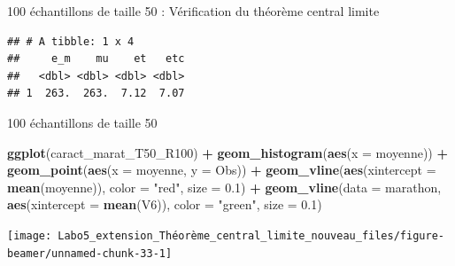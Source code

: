 \documentclass[ignorenonframetext,]{beamer}
\newenvironment{Shaded}{\begin{snugshade}}{\end{snugshade}}
\newcommand{\KeywordTok}[1]{\textcolor[rgb]{0.13,0.29,0.53}{\textbf{#1}}}
\newcommand{\DataTypeTok}[1]{\textcolor[rgb]{0.13,0.29,0.53}{#1}}
\newcommand{\DecValTok}[1]{\textcolor[rgb]{0.00,0.00,0.81}{#1}}
\newcommand{\FloatTok}[1]{\textcolor[rgb]{0.00,0.00,0.81}{#1}}
\newcommand{\StringTok}[1]{\textcolor[rgb]{0.31,0.60,0.02}{#1}}
\newcommand{\OperatorTok}[1]{\textcolor[rgb]{0.81,0.36,0.00}{\textbf{#1}}}
\newcommand{\NormalTok}[1]{#1}
\begin{document}
\begin{frame}[fragile]{100 échantillons de taille 50 : Vérification du
théorème central limite}

\begin{Shaded}
\end{Shaded}

\begin{verbatim}
## # A tibble: 1 x 4
##     e_m    mu    et   etc
##   <dbl> <dbl> <dbl> <dbl>
## 1  263.  263.  7.12  7.07
\end{verbatim}

\end{frame}

\begin{frame}[fragile]{100 échantillons de taille 50}

\begin{Shaded}
\begin{Highlighting}[]
\KeywordTok{ggplot}\NormalTok{(caract_marat_T50_R100) }\OperatorTok{+}
\StringTok{  }\KeywordTok{geom_histogram}\NormalTok{(}\KeywordTok{aes}\NormalTok{(}\DataTypeTok{x =}\NormalTok{ moyenne)) }\OperatorTok{+}
\StringTok{  }\KeywordTok{geom_point}\NormalTok{(}\KeywordTok{aes}\NormalTok{(}\DataTypeTok{x =}\NormalTok{ moyenne, }\DataTypeTok{y =}\NormalTok{ Obs)) }\OperatorTok{+}
\StringTok{  }\KeywordTok{geom_vline}\NormalTok{(}\KeywordTok{aes}\NormalTok{(}\DataTypeTok{xintercept =} \KeywordTok{mean}\NormalTok{(moyenne)), }\DataTypeTok{color =} \StringTok{"red"}\NormalTok{, }\DataTypeTok{size =} \FloatTok{0.1}\NormalTok{) }\OperatorTok{+}
\StringTok{  }\KeywordTok{geom_vline}\NormalTok{(}\DataTypeTok{data =}\NormalTok{ marathon, }\KeywordTok{aes}\NormalTok{(}\DataTypeTok{xintercept =} \KeywordTok{mean}\NormalTok{(V6)), }\DataTypeTok{color =} \StringTok{"green"}\NormalTok{, }\DataTypeTok{size =} \FloatTok{0.1}\NormalTok{)}
\end{Highlighting}
\end{Shaded}

\texttt{[image: Labo5\_extension\_Théorème\_central\_limite\_nouveau\_files/figure-beamer/unnamed-chunk-33-1]}

\end{frame}
\end{document}
